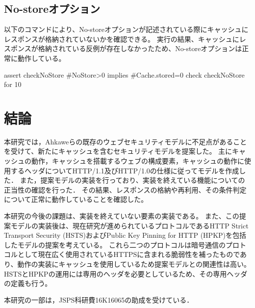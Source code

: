 \documentclass{css}
\begin{document}

\subsection{No-storeオプション}
以下のコマンドにより、No-storeオプションが記述されている際にキャッシュにレスポンスが格納されていないかを確認できる。
実行の結果、キャッシュにレスポンスが格納されている反例が存在しなかったため、No-storeオプションは正常に動作している。\\
\hrulefill
\begin{small}
\begin{verbatimtab}[2]
assert checkNoStore{
	#NoStore>0 implies #Cache.stored=0
}
check checkNoStore for 10
\end{verbatimtab}
\end{small}
\hrulefill

\color{black}

\section{結論}
本研究では，Ahkaweらの既存のウェブセキュリティモデル\cite{webmodel}に不足点があることを受けて、新たにキャッシュを含むセキュリティモデルを提案した。
主にキャッシュの動作，キャッシュを搭載するウェブの構成要素，キャッシュの動作に使用するヘッダについてHTTP/1.1及びHTTP/1.0の仕様に従ってモデルを作成した．
また，提案モデルの実装を行っており、実装を終えている機能についての正当性の確認を行った．
その結果、レスポンスの格納や再利用、その条件判定について正常に動作していることを確認した。

本研究の今後の課題は、実装を終えていない要素の実装である。
また、この提案モデルの実装後は、現在研究が進められているプロトコルであるHTTP Strict Transport Security (HSTS)\cite{rfc6797}およびPublic Key Pinning for HTTP (HPKP)\cite{rfc7469}を包括したモデルの提案を考えている。
これら二つのプロトコルは暗号通信のプロトコルとして現在広く使用されているHTTPSに含まれる脆弱性を補ったものであり、動作の実装にキャッシュを使用しているため提案モデルとの関連性は高い。
HSTSとHPKPの運用には専用のヘッダを必要としているため、その専用ヘッダの定義も行う。

\begin{acknowledgment}
本研究の一部は，JSPS科研費16K16065の助成を受けている．
\end{acknowledgment}



\end{document}
